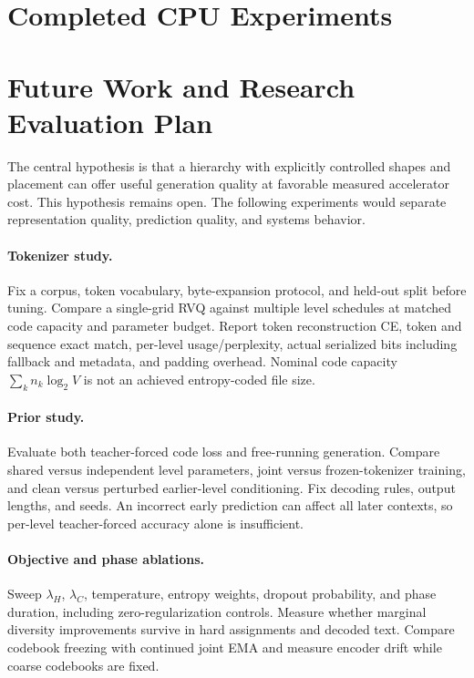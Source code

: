 \documentclass[11pt,a4paper]{article}
\begin{document}
\section{Completed CPU Experiments}
\label{sec:experiments}


\section{Future Work and Research Evaluation Plan}
\label{sec:plan}
The central hypothesis is that a hierarchy with explicitly controlled shapes
and placement can offer useful generation quality at favorable measured
accelerator cost. This hypothesis remains open. The following experiments
would separate representation quality, prediction quality, and systems behavior.

\paragraph{Tokenizer study.}
Fix a corpus, token vocabulary, byte-expansion protocol, and held-out split
before tuning. Compare a single-grid RVQ against multiple level schedules at
matched code capacity and parameter budget. Report token reconstruction CE,
token and sequence exact match, per-level usage/perplexity, actual serialized
bits including fallback and metadata, and padding overhead. Nominal code
capacity \(\sum_k n_k\log_2 V\) is not an achieved entropy-coded file size.

\paragraph{Prior study.}
Evaluate both teacher-forced code loss and free-running generation. Compare
shared versus independent level parameters, joint versus frozen-tokenizer
training, and clean versus perturbed earlier-level conditioning. Fix decoding
rules, output lengths, and seeds. An incorrect early prediction can affect all
later contexts, so per-level teacher-forced accuracy alone is insufficient.

\paragraph{Objective and phase ablations.}
Sweep \(\lambda_H\), \(\lambda_C\), temperature, entropy weights, dropout
probability, and phase duration, including zero-regularization controls.
Measure whether marginal diversity improvements survive in hard assignments
and decoded text. Compare codebook freezing with continued joint EMA and
measure encoder drift while coarse codebooks are fixed.
\end{document}
